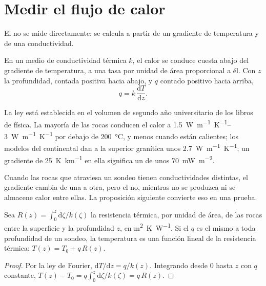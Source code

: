 \section{Medir el flujo de calor}

El  no se mide directamente: se calcula a partir de un gradiente de temperatura y de una conductividad.

\begin{proposition}\label{prop:b1:heat-budget:fourier}
En un medio de conductividad térmica $k$, el calor se conduce cuesta abajo del gradiente de temperatura, a una tasa por
unidad de área proporcional a él. Con $z$ la profundidad, contada positiva hacia abajo, y $q$ contado positivo hacia arriba,
\[
  q = k\,\frac{\mathrm dT}{\mathrm dz} .
\]
\end{proposition}
\admitted

La ley está establecida en el volumen de segundo año universitario de los libros de física. La mayoría de las rocas conducen
el calor a \qtyrange{1.5}{3}{W.m^{-1}.K^{-1}} por debajo de \qty{200}{\celsius}, y menos cuando están calientes; los modelos del
 continental dan a la  superior granítica unos \qty{2.7}{W.m^{-1}.K^{-1}};
un gradiente de \qty{25}{K.km^{-1}} en ella significa un  de unos \qty{70}{mW.m^{-2}}.

Cuando las rocas que atraviesa un sondeo tienen conductividades distintas, el gradiente cambia de una a otra, pero el  no, mientras no se produzca ni se almacene calor entre ellas. La proposición siguiente convierte eso en una prueba.

\begin{proposition}\label{prop:b1:heat-budget:bullard}
Sea $R(z) = \int_0^z \mathrm d\zeta/k(\zeta)$ la resistencia térmica, por unidad de área, de las rocas entre la superficie y la
profundidad $z$, en \unit{m^2.K.W^{-1}}. Si el  $q$ es el mismo a toda profundidad de un sondeo, la temperatura es
una función lineal de la resistencia térmica: $T(z) = T_0 + q\,R(z)$.
\end{proposition}

\begin{proof}
Por la ley de Fourier, $\mathrm dT/\mathrm dz = q/k(z)$. Integrando desde $0$ hasta $z$ con $q$ constante,
$T(z) - T_0 = q\int_0^z \mathrm d\zeta/k(\zeta) = q\,R(z)$.
\end{proof}

